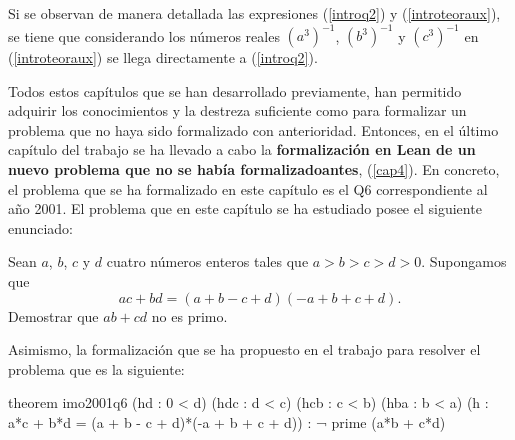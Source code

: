 Si se observan de manera detallada las expresiones (\ref{introq2}) y
(\ref{introteoraux}), se tiene que considerando los números reales
\((a^{3})^{-1}\), \((b^{3})^{-1}\) y \((c^{3})^{-1}\) en
(\ref{introteoraux}) se llega directamente a (\ref{introq2}).

Todos estos capítulos que se han desarrollado previamente, han permitido
adquirir los conocimientos y la destreza suficiente como para formalizar
un problema que no haya sido formalizado con anterioridad. Entonces, en
el último capítulo del trabajo se ha llevado a cabo la
\textbf{formalización en Lean de un nuevo problema que no se había
formalizadoantes}, (\ref{cap4}). En concreto, el problema que se ha
formalizado en este capítulo es el Q6 correspondiente al año 2001. El
problema que en este capítulo se ha estudiado posee el siguiente
enunciado:

\noindent
Sean \(a\), \(b\), \(c\) y \(d\) cuatro números enteros tales que
\(a > b > c > d > 0\). Supongamos que
\begin{equation}\label{introhipotesis}\tag{h}
  ac+bd = (a+b-c+d)(-a+b+c+d).
\end{equation}
Demostrar que \(ab+cd\) no es primo.

Asimismo, la formalización que se ha propuesto en el trabajo para
resolver el problema que es la siguiente:

\begin{leancode}
theorem imo2001q6
  (hd  : 0 < d)
  (hdc : d < c)
  (hcb : c < b)
  (hba : b < a)
  (h : a*c + b*d = (a + b - c + d)*(-a + b + c + d))
  : ¬ prime (a*b + c*d)
\end{leancode}

